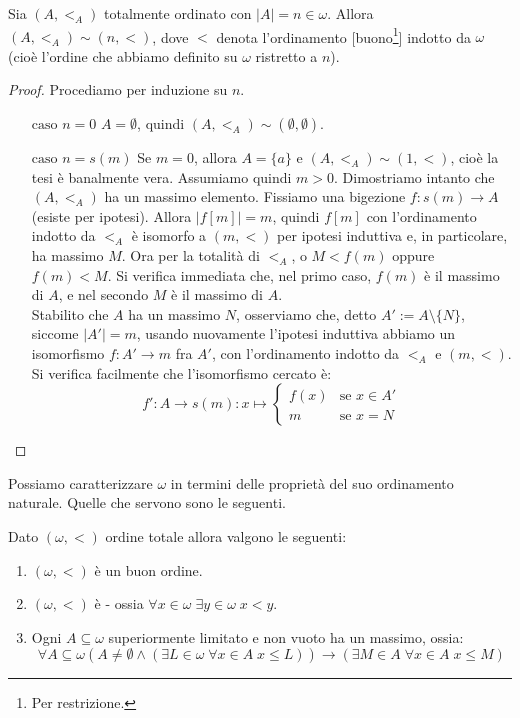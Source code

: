 \documentclass[11pt]{scrartcl}
\begin{document}
\begin{remark}
	Sia $(A,<_A)$ totalmente ordinato con $|A| = n \in \omega$. Allora $(A,<_A) \sim (n,<)$, dove $<$ denota l'ordinamento [buono\footnote{Per restrizione.}] indotto da $\omega$ (cioè l'ordine che abbiamo definito su $\omega$ ristretto a $n$).
\end{remark}

\begin{proof}
	Procediamo per induzione su $n$.
	\begin{itemize}
		\item[$\boxed{\text{caso $n = 0$}}$] $A = \emptyset$, quindi $(A,<_A) \sim (\emptyset,\emptyset)$.
		\item[$\boxed{\text{caso $n = s(m)$}}$] Se $m = 0$, allora $A = \{a\}$ e $(A,<_A) \sim (1,<)$, cioè la tesi è banalmente vera. Assumiamo quindi $m>0$. Dimostriamo intanto che $(A,<_A)$ ha un massimo elemento.
		Fissiamo una bigezione $f : s(m) \rightarrow A$ (esiste per ipotesi). Allora $|f[m]| = m$, quindi $f[m]$ con l'ordinamento indotto da $<_A$ è isomorfo a $(m,<)$ per ipotesi induttiva e, in particolare, ha massimo $M$. Ora per la totalità di $<_A$,
		o $M < f(m)$ oppure $f(m)<M$. Si verifica immediata che, nel primo caso, $f(m)$ è il massimo di $A$, e nel secondo $M$ è il massimo di $A$.\\
		Stabilito che $A$ ha un massimo $N$, osserviamo che, detto $A' := A \setminus\{N\}$, siccome $|A'| = m$, usando nuovamente l'ipotesi induttiva abbiamo un isomorfismo $f : A' \rightarrow m$ fra $A'$, con l'ordinamento indotto da $<_A$ e $(m,<)$.
		Si verifica facilmente che l'isomorfismo cercato è:
		\[ f' : A \longrightarrow s(m) : x \longmapsto \begin{cases}
			f(x) &\text{se $x \in A'$} \\
			m &\text{se $x = N$}
		\end{cases}
			\]
	\end{itemize}
\end{proof}

Possiamo caratterizzare $\omega$ in termini delle proprietà del suo ordinamento naturale. Quelle che servono sono le seguenti.

\begin{proposition}
	Dato $(\omega,<)$ ordine totale allora valgono le seguenti:
	\begin{enumerate}[(1)]
		\item $(\omega,<)$ è un buon ordine.
		\item $(\omega,<)$ è  - ossia $\forall x \in \omega \; \exists y \in \omega \; x < y$.
		\item Ogni $A \subseteq \omega$ superiormente limitato e non vuoto ha un massimo, ossia:
		\[ \forall A \subseteq \omega (A \ne \emptyset \land (\exists L \in \omega \; \forall x \in A \; x \leq L)) \rightarrow (\exists M \in A \; \forall x \in A \; x \leq M)
			\]
	\end{enumerate}
\end{proposition}
\end{document}
